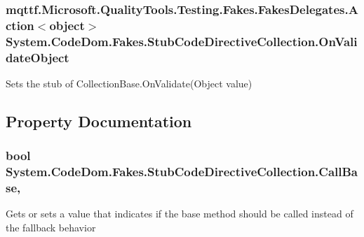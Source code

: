 \hypertarget{class_system_1_1_code_dom_1_1_fakes_1_1_stub_code_directive_collection_a1824debcd86e235614f3fa83d50fd383}{
\subsubsection[{On\-Validate\-Object}]{\setlength{\rightskip}{0pt plus 5cm}mqttf.\-Microsoft.\-Quality\-Tools.\-Testing.\-Fakes.\-Fakes\-Delegates.\-Action$<$object$>$ System.\-Code\-Dom.\-Fakes.\-Stub\-Code\-Directive\-Collection.\-On\-Validate\-Object}}\label{class_system_1_1_code_dom_1_1_fakes_1_1_stub_code_directive_collection_a1824debcd86e235614f3fa83d50fd383}


Sets the stub of Collection\-Base.\-On\-Validate(\-Object value)



\subsection{Property Documentation}
\hypertarget{class_system_1_1_code_dom_1_1_fakes_1_1_stub_code_directive_collection_ac2b670223a8e17aaf37b6a6f27c92bf5}{
\subsubsection[{Call\-Base}]{\setlength{\rightskip}{0pt plus 5cm}bool System.\-Code\-Dom.\-Fakes.\-Stub\-Code\-Directive\-Collection.\-Call\-Base\hspace{0.3cm}{\ttfamily [get]}, {\ttfamily [set]}}}\label{class_system_1_1_code_dom_1_1_fakes_1_1_stub_code_directive_collection_ac2b670223a8e17aaf37b6a6f27c92bf5}


Gets or sets a value that indicates if the base method should be called instead of the fallback behavior


